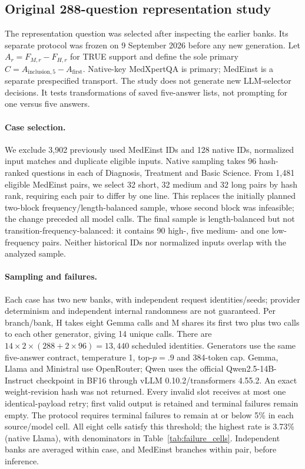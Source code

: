 \subsection{Original 288-question representation study}
The representation question was selected after inspecting the earlier banks. Its separate protocol was frozen on 9 September 2026 before any new generation. Let $A_r=F_{M,r}-F_{H,r}$ for TRUE support and define the sole primary $C=A_{\mathrm{inclusion},5}-A_{\mathrm{first}}$. Native-key MedXpertQA is primary; MedEinst is a separate prespecified transport. The study does not generate new LLM-selector decisions. It tests transformations of saved five-answer lists, not prompting for one versus five answers.

\paragraph{Case selection.}
We exclude 3,902 previously used MedEinst IDs and 128 native IDs, normalized input matches and duplicate eligible inputs. Native sampling takes 96 hash-ranked questions in each of Diagnosis, Treatment and Basic Science. From 1,481 eligible MedEinst pairs, we select 32 short, 32 medium and 32 long pairs by hash rank, requiring each pair to differ by one line. This replaces the initially planned two-block frequency/length-balanced sample, whose second block was infeasible; the change preceded all model calls. The final sample is length-balanced but not transition-frequency-balanced: it contains 90 high-, five medium- and one low-frequency pairs. Neither historical IDs nor normalized inputs overlap with the analyzed sample.

\paragraph{Sampling and failures.}
Each case has two new banks, with independent request identities/seeds; provider determinism and independent internal randomness are not guaranteed. Per branch/bank, H takes eight Gemma calls and M shares its first two plus two calls to each other generator, giving 14 unique calls. There are $14\times2\times(288+2\times96)=13,440$ scheduled identities. Generators use the same five-answer contract, temperature 1, top-$p=.9$ and 384-token cap. Gemma, Llama and Ministral use OpenRouter; Qwen uses the official Qwen2.5-14B-Instruct checkpoint in BF16 through vLLM 0.10.2/transformers 4.55.2. An exact weight-revision hash was not returned. Every invalid slot receives at most one identical-payload retry; first valid output is retained and terminal failures remain empty. The protocol requires terminal failures to remain at or below 5\% in each source/model cell. All eight cells satisfy this threshold; the highest rate is 3.73\% (native Llama), with denominators in Table~\ref{tab:failure_cells}. Independent banks are averaged within case, and MedEinst branches within pair, before inference.

